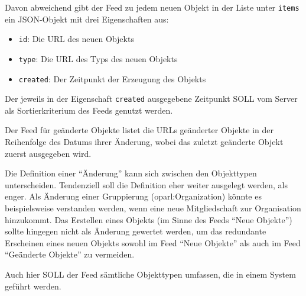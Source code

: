 \documentclass[,a4paper]{article}
\begin{document}
Davon abweichend gibt der Feed zu jedem neuen Objekt in der Liste unter
\texttt{items} ein JSON-Objekt mit drei Eigenschaften aus:

\begin{itemize}
\itemsep1pt\parskip0pt
\item
  \texttt{id}: Die URL des neuen Objekts
\item
  \texttt{type}: Die URL des Typs des neuen Objekts
\item
  \texttt{created}: Der Zeitpunkt der Erzeugung des Objekts
\end{itemize}

Der jeweils in der Eigenschaft \texttt{created} ausgegebene Zeitpunkt
SOLL vom Server als Sortierkriterium des Feeds genutzt werden.


Der Feed für geänderte Objekte listet die URLs geänderter Objekte in der
Reihenfolge des Datums ihrer Änderung, wobei das zuletzt geänderte
Objekt zuerst ausgegeben wird.

Die Definition einer ``Änderung'' kann sich zwischen den Objekttypen
unterscheiden. Tendenziell soll die Definition eher weiter ausgelegt
werden, als enger. Als Änderung einer Gruppierung (oparl:Organization)
könnte es beispielsweise verstanden werden, wenn eine neue
Mitgliedschaft zur Organisation hinzukommt. Das Erstellen eines Objekts
(im Sinne des Feeds ``Neue Objekte'') sollte hingegen nicht als Änderung
gewertet werden, um das redundante Erscheinen eines neuen Objekts sowohl
im Feed ``Neue Objekte'' als auch im Feed ``Geänderte Objekte'' zu
vermeiden.

Auch hier SOLL der Feed sämtliche Objekttypen umfassen, die in einem
System geführt werden.
\end{document}
